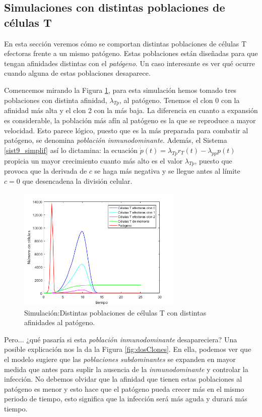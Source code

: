 \subsection{Simulaciones con distintas poblaciones de células T}

En esta sección veremos cómo se comportan distintas poblaciones de células T efectoras frente a un mismo patógeno. Estas poblaciones están diseñadas para que tengan afinidades distintas con el \textit{patógeno}. Un caso interesante es ver qué ocurre cuando alguna de estas poblaciones desaparece. 

Comencemos mirando la Figura \ref{fig:tresClones}, para esta simulación hemos tomado tres poblaciones con distinta afinidad, $\lambda_{Tp}$, al patógeno. Tenemos el clon 0 con la afinidad más alta y el clon 2 con la más baja. La diferencia en cuanto a expansión es considerable, la población más afín al patógeno es la que se reproduce a mayor velocidad. Esto parece lógico, puesto que es la más preparada para combatir al patógeno, se denomina \textit{población inmunodominante}. Además, el Sistema 	\ref{sist9_simplif} así lo dictamina: la ecuación $\dot{p}(t) = \lambda_{Tp}r_{T}(t) - \lambda_{pp}p(t)$ propicia un mayor crecimiento cuanto más alto es el valor $\lambda_{Tp}$, puesto que provoca que la derivada de $c$ se haga más negativa y se llegue antes al límite $c = 0$ que desencadena la división celular.

\begin{figure}[t]
	\centering
	\includegraphics[width=0.7\textwidth]{Imagenes/Simulaciones/tresClones}
	\caption{Simulación:Distintas poblaciones de células T con distintas afinidades al patógeno.}
	\label{fig:tresClones}
\end{figure}


Pero... ¿qué pasaría si esta \textit{población inmunodominante} desapareciera? Una posible explicación nos la da la Figura \ref{fig:dosClones}. En ella, podemos ver que el modelo sugiere que las \textit{poblaciones subdominantes} se expanden en mayor medida que antes para suplir la ausencia de la \textit{inmunodominante} y controlar la infección. No debemos olvidar que la afinidad que tienen estas poblaciones al patógeno es menor y esto hace que el patógeno pueda crecer más en el mismo periodo de tiempo, esto significa que la infección será más aguda y durará más tiempo. 


